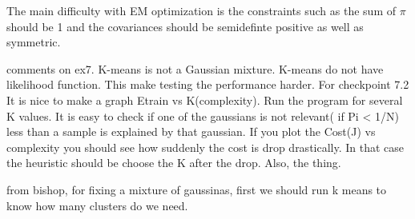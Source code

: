 \documentclass{article}
\begin{document}
The main difficulty with EM optimization is the constraints such as the sum
of $\pi$ should be 1 and the covariances should be semidefinte positive as well as symmetric. 

comments on ex7. K-means is not a Gaussian mixture. K-means do not have likelihood function. This
make testing the performance harder. For checkpoint 7.2 It is nice to make a graph Etrain vs K(complexity). Run the program for several K values. It is easy to check if one of the gaussians is not relevant( if Pi < 1/N) less than a sample is explained by that gaussian. 
If you plot the Cost(J) vs complexity you should see how suddenly the cost is drop drastically. In that case the heuristic should be choose the K after the drop. 
Also, the thing. 

from bishop, for fixing a mixture of gaussinas, first we should run k means to know how many clusters do we need. 
 
\end{document}
